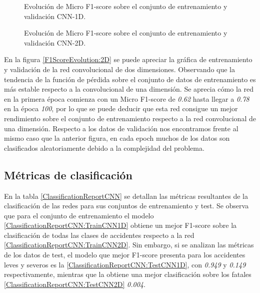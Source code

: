     \begin{figure}[H]
        \centering
        
        \caption{Evolución de Micro F1-score sobre el conjunto de entrenamiento y validación CNN-1D.}
        \label{F1ScoreEvolution:1D}
    \end{figure}
    \begin{figure}[H]
        \centering
        
        \caption{Evolución de Micro F1-score sobre el conjunto de entrenamiento y validación CNN-2D.}
        \label{F1ScoreEvolution:2D}
    \end{figure}


    En la figura \eqref{F1ScoreEvolution:2D} se puede apreciar la gráfica de entrenamiento y validación de la red convolucional de dos dimensiones. Observando que la tendencia de la función de pérdida sobre el conjunto de datos de entrenamiento es más estable respecto a la convolucional de una dimensión. Se aprecia cómo la red en la primera época comienza con un Micro F1-score de \textit {0.62} hasta llegar a \textit{0.78} en la época \textit{100}, por lo que se puede deducir que esta red consigue un mejor rendimiento sobre el conjunto de entrenamiento respecto a la red convolucional de una dimensión. Respecto a los datos de validación nos encontramos frente al mismo caso que la anterior figura, en cada epoch muchos de los datos son clasificados aleatoriamente debido a la complejidad del problema.

  \subsection{Métricas de clasificación}

    En la tabla \eqref{ClassificationReportCNN} se detallan las métricas resultantes de la clasificación de las redes para sus conjuntos de entrenamiento y test. Se observa que para el conjunto de entrenamiento el modelo  \eqref{ClassificationReportCNN:TrainCNN1D} obtiene un mejor F1-score sobre la clasificación de todas las clases de accidentes respecto a la red  \eqref{ClassificationReportCNN:TrainCNN2D}. Sin embargo, si se analizan las métricas de los datos de test, el modelo que mejor F1-score presenta para los accidentes leves y severos es la  \eqref{ClassificationReportCNN:TestCNN1D}, con \textit{0.949} y \textit{0.149} respectivamente, mientras que la  obtiene una mejor clasificación sobre los fatales \eqref{ClassificationReportCNN:TestCNN2D} \textit{0.004}.

